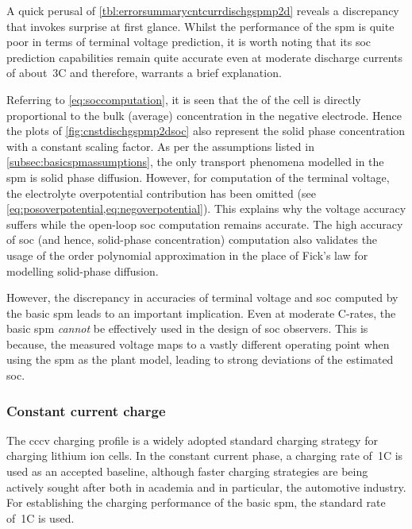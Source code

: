 

A   quick   perusal  of \cref{tbl:errorsummarycntcurrdischgspmp2d}   reveals   a
discrepancy that invokes surprise at first glance. Whilst the performance of the
\gls{spm} is  quite poor in  terms of terminal  voltage prediction, it  is worth
noting that its \gls{soc} prediction  capabilities remain quite accurate even at
moderate  discharge  currents  of  about~3C and  therefore,  warrants  a  brief
explanation.

Referring to \cref{eq:soccomputation}, it is  seen that the  of
the cell  is directly proportional  to the  bulk (average) concentration  in the
negative  electrode.  Hence  the  plots  of \cref{fig:cnstdischgspmp2dsoc}  also
represent the solid  phase concentration with a constant scaling  factor. As per
the assumptions listed  in \cref{subsec:basicspmassumptions}, the only transport
phenomena  modelled in  the \gls{spm}  is  solid phase  diffusion. However,  for
computation of the terminal  voltage, the electrolyte overpotential contribution
has  been   omitted  (see \cref{eq:posoverpotential,eq:negoverpotential}).  This
explains  why  the  voltage  accuracy  suffers  while  the  open-loop  \gls{soc}
computation  remains  accurate.  The  high accuracy  of  \gls{soc}  (and  hence,
solid-phase  concentration)   computation  also  validates  the   usage  of  the
 order polynomial  approximation in the place of  Fick's law for
modelling solid-phase diffusion.

However,  the  discrepancy  in  accuracies of  terminal  voltage  and  \gls{soc}
computed  by the  basic \gls{spm}  leads to  an important  implication. Even  at
moderate C-rates, the  basic \gls{spm} \emph{cannot} be effectively  used in the
design of \gls{soc}  observers. This is because, the measured  voltage maps to a
vastly different  operating point when using  the \gls{spm} as the  plant model,
leading to strong deviations of the estimated \gls{soc}.


\subsubsection*{Constant current charge}\label{subsubsec:cnstcurrchgsim}

The \gls{cccv} charging  profile is a widely adopted  standard charging strategy
for charging lithium  ion cells. In the constant current  phase, a charging rate
of~1C is  used as an accepted baseline, although  faster charging strategies are
being actively sought  after both in academia and in  particular, the automotive
industry. For establishing the charging performance of the basic \gls{spm}, the
standard rate of~1C is used.

